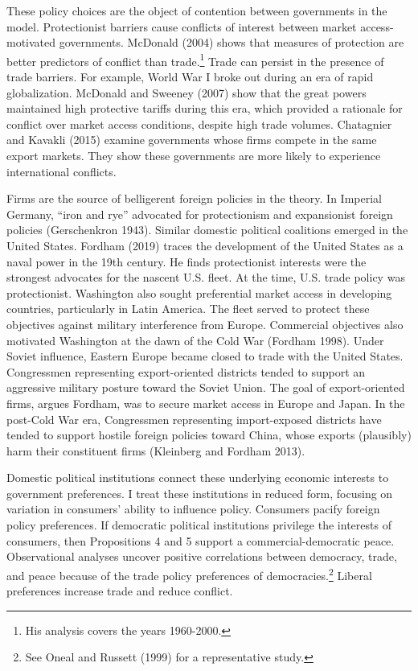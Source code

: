 \documentclass{puthesis}
\begin{document}
These policy choices are the object of contention between governments in
the model. Protectionist barriers cause conflicts of interest between
market access-motivated governments. McDonald (2004) shows that measures
of protection are better predictors of conflict than trade.\footnote{His
  analysis covers the years 1960-2000.} Trade can persist in the
presence of trade barriers. For example, World War I broke out during an
era of rapid globalization. McDonald and Sweeney (2007) show that the
great powers maintained high protective tariffs during this era, which
provided a rationale for conflict over market access conditions, despite
high trade volumes. Chatagnier and Kavakli (2015) examine governments
whose firms compete in the same export markets. They show these
governments are more likely to experience international conflicts.

Firms are the source of belligerent foreign policies in the theory. In
Imperial Germany, ``iron and rye'' advocated for protectionism and
expansionist foreign policies (Gerschenkron 1943). Similar domestic
political coalitions emerged in the United States. Fordham (2019) traces
the development of the United States as a naval power in the 19th
century. He finds protectionist interests were the strongest advocates
for the nascent U.S. fleet. At the time, U.S. trade policy was
protectionist. Washington also sought preferential market access in
developing countries, particularly in Latin America. The fleet served to
protect these objectives against military interference from Europe.
Commercial objectives also motivated Washington at the dawn of the Cold
War (Fordham 1998). Under Soviet influence, Eastern Europe became closed
to trade with the United States. Congressmen representing
export-oriented districts tended to support an aggressive military
posture toward the Soviet Union. The goal of export-oriented firms,
argues Fordham, was to secure market access in Europe and Japan. In the
post-Cold War era, Congressmen representing import-exposed districts
have tended to support hostile foreign policies toward China, whose
exports (plausibly) harm their constituent firms (Kleinberg and Fordham
2013).

Domestic political institutions connect these underlying economic
interests to government preferences. I treat these institutions in
reduced form, focusing on variation in consumers' ability to influence
policy. Consumers pacify foreign policy preferences. If democratic
political institutions privilege the interests of consumers, then
Propositions 4 and 5 support a commercial-democratic peace.
Observational analyses uncover positive correlations between democracy,
trade, and peace because of the trade policy preferences of
democracies.\footnote{See Oneal and Russett (1999) for a representative
  study.} Liberal preferences increase trade and reduce conflict.
\end{document}
